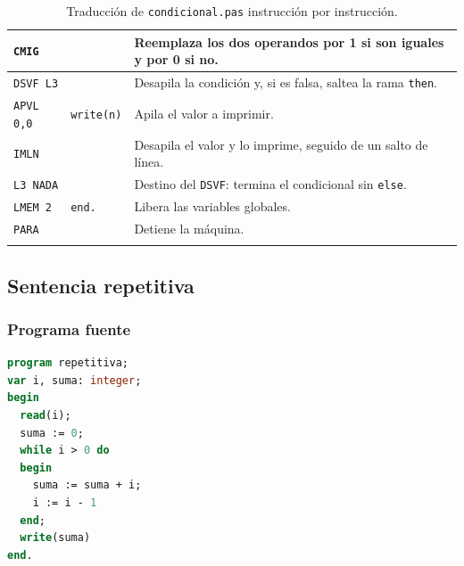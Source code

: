 \documentclass[12pt]{article}
\begin{document}
\begin{longtable}{|p{3.2cm}|p{5cm}|p{7cm}|}
\hline
\texttt{CMIG} & \texttt{} & Reemplaza los dos operandos por 1 si son iguales y por 0 si no. \\
\hline
\texttt{DSVF L3} & \texttt{} & Desapila la condición y, si es falsa, saltea la rama \texttt{then}. \\
\hline
\texttt{APVL 0,0} & \texttt{write(n)} & Apila el valor a imprimir. \\
\hline
\texttt{IMLN} & \texttt{} & Desapila el valor y lo imprime, seguido de un salto de línea. \\
\hline
\texttt{L3 NADA} & \texttt{} & Destino del \texttt{DSVF}: termina el condicional sin \texttt{else}. \\
\hline
\texttt{LMEM 2} & \texttt{end.} & Libera las variables globales. \\
\hline
\texttt{PARA} & \texttt{} & Detiene la máquina. \\
\hline
\caption{Traducción de \texttt{condicional.pas} instrucción por instrucción.}
\label{tab:condicional}
\end{longtable}

\subsection{Sentencia repetitiva}


\subsubsection*{Programa fuente}
\begin{lstlisting}[frame=single, language=pascal, basicstyle=\ttfamily\small]
program repetitiva;
var i, suma: integer;
begin
  read(i);
  suma := 0;
  while i > 0 do
  begin
    suma := suma + i;
    i := i - 1
  end;
  write(suma)
end.
\end{lstlisting}
\end{document}
